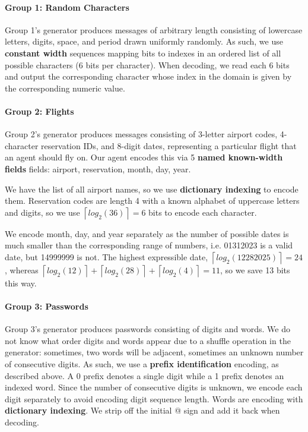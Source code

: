 \documentclass[titlepage]{article}
\begin{document}
\paragraph{Group 1: Random Characters}
Group 1's generator produces messages of arbitrary length consisting of lowercase letters, digits, space, and period drawn uniformly randomly. As such, we use \textbf{constant width} sequences mapping bits to indexes in an ordered list of all possible characters (6 bits per character). When decoding, we read each 6 bits and output the corresponding character whose index in the domain is given by the corresponding numeric value.

\paragraph{Group 2: Flights}
Group 2's generator produces messages consisting of 3-letter airport codes, 4-character reservation IDs, and 8-digit dates, representing a particular flight that an agent should fly on. Our agent encodes this via 5 \textbf{named known-width fields} fields: airport, reservation, month, day, year.

We have the list of all airport names, so we use \textbf{dictionary indexing} to encode them. Reservation codes are length 4 with a known alphabet of uppercase letters and digits, so we use $\left\lceil log_2(36)\right\rceil = 6$ bits to encode each character.

We encode month, day, and year separately as the number of possible dates is much smaller than the corresponding range of numbers, i.e. 01312023 is a valid date, but 14999999 is not. The highest expressible date, $\left\lceil{log_2(12282025)}\right\rceil = 24$, whereas $\left\lceil{log_2(12)}\right\rceil + \left\lceil{log_2(28)}\right\rceil + \left\lceil{log_2(4)}\right\rceil = 11$, so we save 13 bits this way.

\paragraph{Group 3: Passwords} Group 3's generator produces passwords consisting of digits and words. We do not know what order digits and words appear due to a shuffle operation in the generator: sometimes, two words will be adjacent, sometimes an unknown number of consecutive digits. As such, we use a \textbf{prefix identification} encoding, as described above. A 0 prefix denotes a single digit while a 1 prefix denotes an indexed word. Since the number of consecutive digits is unknown, we encode each digit separately to avoid encoding digit sequence length. Words are encoding with \textbf{dictionary indexing}. We strip off the initial @ sign and add it back when decoding.
\end{document}
